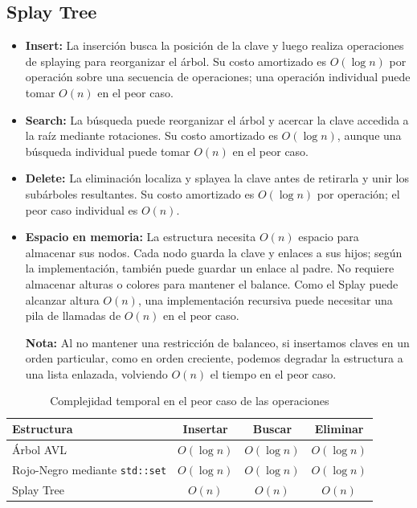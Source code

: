 \documentclass[11pt,letterpaper]{article}
\begin{document}
\subsection{Splay Tree}
\begin{itemize}
    \item \textbf{Insert:} La inserción busca la posición de la clave y luego
    realiza operaciones de splaying para reorganizar el árbol. Su costo
    amortizado es $O(\log n)$ por operación sobre una secuencia de operaciones;
    una operación individual puede tomar $O(n)$ en el peor caso.

    \item \textbf{Search:} La búsqueda puede reorganizar el árbol y acercar la
    clave accedida a la raíz mediante rotaciones. Su costo amortizado es
    $O(\log n)$, aunque una búsqueda individual puede tomar $O(n)$ en el peor
    caso.

    \item \textbf{Delete:} La eliminación localiza y splayea la clave antes de
    retirarla y unir los subárboles resultantes. Su costo amortizado es
    $O(\log n)$ por operación; el peor caso individual es $O(n)$.

    \item \textbf{Espacio en memoria:} La estructura necesita $O(n)$ espacio
    para almacenar sus nodos. Cada nodo guarda la clave y enlaces a sus hijos;
    según la implementación, también puede guardar un enlace al padre. No
    requiere almacenar alturas o colores para mantener el balance. Como el
    Splay puede alcanzar altura $O(n)$, una implementación recursiva puede
    necesitar una pila de llamadas de $O(n)$ en el peor caso.

    \textbf{Nota:} Al no mantener una restricción de balanceo, si insertamos claves en un orden particular, como en orden creciente, podemos degradar la estructura a una lista enlazada, volviendo $O(n)$ el tiempo en el peor caso.
\end{itemize}

\begin{table}[ht]
    \centering
    \caption{Complejidad temporal en el peor caso de las operaciones}
    \label{tab:complejidad-arboles}
    \begin{tabular}{|l|c|c|c|}
        \hline
        \textbf{Estructura} & \textbf{Insertar} & \textbf{Buscar} & \textbf{Eliminar} \\
        \hline
        Árbol AVL & $O(\log n)$ & $O(\log n)$ & $O(\log n)$ \\
        \hline
        Rojo-Negro mediante \texttt{std::set} & $O(\log n)$ & $O(\log n)$ & $O(\log n)$ \\
        \hline
        Splay Tree & $O(n)$ & $O(n)$ & $O(n)$ \\
        \hline
    \end{tabular}
\end{table}
\end{document}
